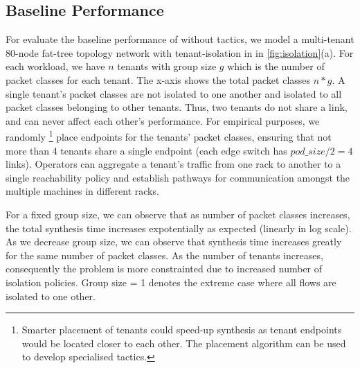 
\subsection{Baseline Performance}
For evaluate the baseline performance of \Name without tactics, we model a multi-tenant
80-node fat-tree topology network with   
tenant-isolation in in \cref{fig:isolation}(a). 
For each workload, we have $n$ tenants with group size $g$ which 
is the number of packet classes for each tenant. The x-axis shows the total packet classes $n*g$. 
A single tenant's packet classes are not isolated to one another and isolated to all packet
classes belonging to other tenants. Thus, two tenants do not share a link, and can never affect
each other's performance. For empirical purposes, 
we randomly
\footnote{Smarter placement of tenants could speed-up synthesis as tenant endpoints would
	be located closer to each other. The placement algorithm can be used to develop specialised tactics.}
  place endpoints for the tenants' packet classes, ensuring that not more than 4 tenants share a single endpoint
  (each edge switch has $pod\_size/2 = 4$ links). 
   Operators can aggregate a tenant's traffic from one rack to
another to a single reachability policy and establish pathways for communication amongst the multiple
machines in different racks. 

For a fixed group size, we can observe that as number of packet classes increases,
the total synthesis time increases expotentially as expected (linearly in log scale). As we decrease group size,
 we can observe that synthesis time increases greatly for the same number of packet classes.
 As the number of tenants increases, consequently the problem is more constrainted 
  due to increased number of isolation policies. 
 Group size = 1 denotes the extreme case where all flows are isolated to one other. 
      

